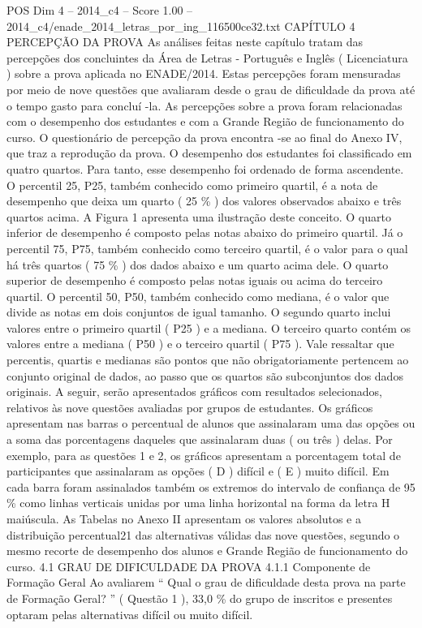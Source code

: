 \begin{textsample}{POS Dim 4 – 2014\_c4 – Score 1.00 – 2014\_c4/enade\_2014\_letras\_por\_ing\_116500ce32.txt}  \label{ex:f4_pos_208}
CAPÍTULO 4 PERCEPÇÃO DA PROVA As análises feitas neste capítulo tratam das percepções dos concluintes da Área de Letras - Português e Inglês ( Licenciatura ) sobre a prova aplicada no ENADE/2014.
Estas percepções foram mensuradas por meio de nove questões que avaliaram desde o grau de dificuldade da prova até o tempo gasto para concluí -la.
As percepções sobre a prova foram relacionadas com o desempenho dos estudantes e com a Grande Região de funcionamento do curso.
O questionário de percepção da prova encontra -se ao final do Anexo IV, que traz a reprodução da prova.
O desempenho dos estudantes foi classificado em quatro quartos.
Para tanto, esse desempenho foi ordenado de forma ascendente.
O percentil 25, P25, também conhecido como primeiro quartil, é a nota de desempenho que deixa um quarto ( 25 \% ) dos valores observados abaixo e três quartos acima.
A Figura 1 apresenta uma ilustração deste conceito.
O quarto inferior de desempenho é composto pelas notas abaixo do primeiro quartil.
Já o percentil 75, P75, também conhecido como terceiro quartil, é o valor para o qual há três quartos ( 75 \% ) dos dados abaixo e um quarto acima dele.
O quarto superior de desempenho é composto pelas notas iguais ou acima do terceiro quartil.
O percentil 50, P50, também conhecido como mediana, é o valor que divide as notas em dois conjuntos de igual tamanho.
O segundo quarto inclui valores entre o primeiro quartil ( P25 ) e a mediana.
O terceiro quarto contém os valores entre a mediana ( P50 ) e o terceiro quartil ( P75 ).
Vale ressaltar que percentis, quartis e medianas são pontos que não obrigatoriamente pertencem ao conjunto original de dados, ao passo que os quartos são subconjuntos dos dados originais.
A seguir, serão apresentados gráficos com resultados selecionados, relativos às nove questões avaliadas por grupos de estudantes.
Os gráficos apresentam nas barras o percentual de alunos que assinalaram uma das opções ou a soma das porcentagens daqueles que assinalaram duas ( ou três ) delas.
Por exemplo, para as questões 1 e 2, os gráficos apresentam a porcentagem total de participantes que assinalaram as opções ( D ) difícil e ( E ) muito difícil.
Em cada barra foram assinalados também os extremos do intervalo de confiança de 95 \% como linhas verticais unidas por uma linha horizontal na forma da letra H maiúscula.
As Tabelas no Anexo II apresentam os valores absolutos e a distribuição percentual21 das alternativas válidas das nove questões, segundo o mesmo recorte de desempenho dos alunos e Grande Região de funcionamento do curso. 4.1 GRAU DE DIFICULDADE DA PROVA 4.1.1 Componente de Formação Geral Ao avaliarem “ Qual o grau de dificuldade desta prova na parte de Formação Geral? ” ( Questão 1 ), 33,0 \% do grupo de inscritos e presentes optaram pelas alternativas difícil ou muito difícil.

\end{textsample}
